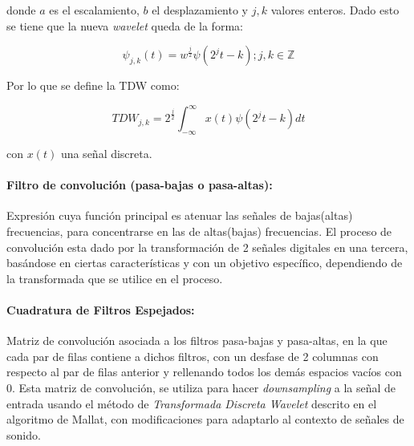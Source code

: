\documentclass[11pt]{article}
\begin{document}
donde \(a\) es el escalamiento, \(b\) el desplazamiento y \(j, k\) valores enteros. Dado esto se tiene que la nueva {\it wavelet} queda de la forma:

\begin{equation*}
    \psi_{j, k}(t)= w^{\frac{j}{2}}\psi(2^{j}t - k); j, k \in \mathbb{Z}
\end{equation*}

Por lo que se define la TDW como:

\begin{equation*}
    TDW_{j, k} = 2^{\frac{j}{2}}\int_{-\infty}^{\infty}x(t)\psi(2^{j}t-k)dt
\end{equation*}

con \(x(t)\) una señal discreta. 

\paragraph*{Filtro de convolución (pasa-bajas o pasa-altas):}
Expresión cuya función principal es atenuar las señales de bajas(altas) frecuencias, para concentrarse en las de altas(bajas) frecuencias. El proceso de convolución esta dado por la transformación de 2 señales digitales en una tercera, basándose en ciertas 
características y con un objetivo específico, dependiendo de la transformada que se utilice en el proceso.

\paragraph*{Cuadratura de Filtros Espejados:}
Matriz de convolución asociada a los filtros pasa-bajas y pasa-altas, en la que cada par de filas contiene a dichos filtros, con un desfase de 2 columnas con respecto al par de filas anterior y rellenando todos los demás espacios vacíos con 0. Esta matriz de convolución, 
se utiliza para hacer {\it downsampling} a la señal de entrada usando el método de {\it Transformada Discreta Wavelet} descrito en el algoritmo de Mallat, con modificaciones para adaptarlo al contexto de señales de sonido.
\end{document}
